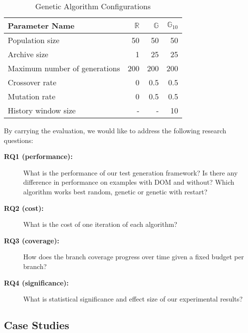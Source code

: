 \documentclass[sigconf,review, anonymous]{acmart}
\newcommand{\Random}{\mathbb{R}}
\newcommand{\Genetic}{\mathbb{G}}
\newcommand{\RGenetic}{\mathbb{G}_{10}}
\begin{document}
\begin{table}
  \caption{Genetic Algorithm Configurations}
  \label{tbl.gen.config}
    \scriptsize
  \begin{tabular}{l|r|r|r}
    \toprule
    \textbf{Parameter Name} &$\Random$&$\Genetic$ &$\RGenetic$ \\
    \hline
    Population size                   & 50  & 50  & 50  \\
    Archive size                      & 1   & 25  & 25  \\
    Maximum number of generations     & 200 & 200 & 200 \\
    Crossover rate                    & 0   & 0.5 & 0.5 \\
    Mutation rate                     & 0   & 0.5 & 0.5 \\
    History window size               & -   & -   & 10  \\
    \bottomrule
  \end{tabular}
\end{table}

By carrying the evaluation, we would like to address the following research questions:
\begin{description}
\item[\textbf{RQ1 (performance):}] What is the performance of our test generation framework? Is there any difference in performance on examples with DOM and without?  Which algorithm works best random, genetic or genetic with restart?
\item[\textbf{RQ2 (cost):}] What is the cost of one iteration of each algorithm?
\item[\textbf{RQ3 (coverage):}] How does the branch coverage progress over time given a fixed budget per branch?
\item[\textbf{RQ4 (significance):}] What is statistical significance and effect size of our experimental results? 
\end{description}


\subsection{Case Studies}
\label{sub.sec.case.studies}
\end{document}
